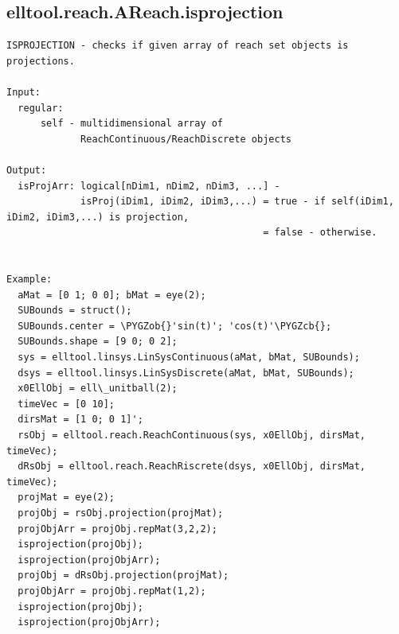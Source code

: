 \documentclass[letterpaper,10pt,english]{sphinxmanual}
\def\PYGZob{\char`\{}
\def\PYGZcb{\char`\}}
\begin{document}
\subsection{elltool.reach.AReach.isprojection}
\label{chap_functions:elltool-reach-areach-isprojection}
\begin{Verbatim}[commandchars=\\\{\}]
ISPROJECTION - checks if given array of reach set objects is projections.

Input:
  regular:
      self - multidimensional array of
             ReachContinuous/ReachDiscrete objects

Output:
  isProjArr: logical[nDim1, nDim2, nDim3, ...] -
             isProj(iDim1, iDim2, iDim3,...) = true - if self(iDim1, iDim2, iDim3,...) is projection,
                                             = false - otherwise.


Example:
  aMat = [0 1; 0 0]; bMat = eye(2);
  SUBounds = struct();
  SUBounds.center = \PYGZob{}'sin(t)'; 'cos(t)'\PYGZcb{};
  SUBounds.shape = [9 0; 0 2];
  sys = elltool.linsys.LinSysContinuous(aMat, bMat, SUBounds);
  dsys = elltool.linsys.LinSysDiscrete(aMat, bMat, SUBounds);
  x0EllObj = ell\_unitball(2);
  timeVec = [0 10];
  dirsMat = [1 0; 0 1]';
  rsObj = elltool.reach.ReachContinuous(sys, x0EllObj, dirsMat, timeVec);
  dRsObj = elltool.reach.ReachRiscrete(dsys, x0EllObj, dirsMat, timeVec);
  projMat = eye(2);
  projObj = rsObj.projection(projMat);
  projObjArr = projObj.repMat(3,2,2);
  isprojection(projObj);
  isprojection(projObjArr);
  projObj = dRsObj.projection(projMat);
  projObjArr = projObj.repMat(1,2);
  isprojection(projObj);
  isprojection(projObjArr);
\end{Verbatim}
\end{document}
